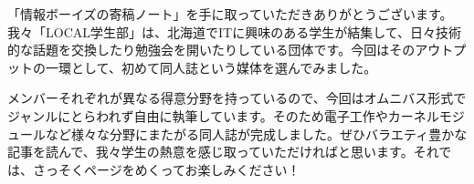 「情報ボーイズの寄稿ノート」を手に取っていただきありがとうございます。我々「LOCAL学生部」は、北海道でITに興味のある学生が結集して、日々技術的な話題を交換したり勉強会を開いたりしている団体です。今回はそのアウトプットの一環として、初めて同人誌という媒体を選んでみました。

メンバーそれぞれが異なる得意分野を持っているので、今回はオムニバス形式でジャンルにとらわれず自由に執筆しています。そのため電子工作やカーネルモジュールなど様々な分野にまたがる同人誌が完成しました。ぜひバラエティ豊かな記事を読んで、我々学生の熱意を感じ取っていただければと思います。それでは、さっそくページをめくってお楽しみください！
